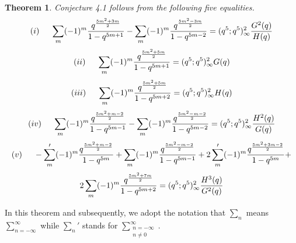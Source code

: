\documentclass[10pt,reqno]{amsart}
\newtheorem{theorem}{Theorem}[section]
\begin{document}
\begin{theorem}
Conjecture 4.1 follows from the following five equalities. \begin{equation}
    (i)\hspace{0.5cm} \displaystyle\sum_{m}(-1)^m\displaystyle\frac{q^{\frac{5m^2+3m}{2}}}{1-q^{5m+1}}-\displaystyle\sum_{m}(-1)^m\displaystyle\frac{q^{\frac{5m^2-3m}{2}}}{1-q^{5m-2}}=(q^5;q^5)_{\infty}^2\displaystyle\frac{G^2(q)}{H(q)} 
\end{equation}
\begin{equation}
    (ii) \hspace{0.5cm}\displaystyle\sum_{m}(-1)^m\displaystyle\frac{q^{\frac{5m^2+5m}{2}}}{1-q^{5m+1}}=(q^5;q^5)_{\infty}^2G(q) 
\end{equation}
\begin{equation}
    (iii)\hspace{0.5cm}\displaystyle\sum_{m}(-1)^m\displaystyle\frac{q^{\frac{5m^2+5m}{2}}}{1-q^{5m+2}}=(q^5;q^5)_{\infty}^2H(q) 
\end{equation}
\begin{equation}
    (iv)\hspace{0.5cm}\displaystyle\sum_{m}(-1)^m\displaystyle\frac{q^{\frac{5m^2+m-2}{2}}}{1-q^{5m-1}}-\displaystyle\sum_{m}(-1)^m\displaystyle\frac{q^{\frac{5m^2-m-2}{2}}}{1-q^{5m-2}}=(q^5;q^5)_{\infty}^2\displaystyle\frac{H^2(q)}{G(q)} 
\end{equation}
\begin{equation*}
    (v)\hspace{0.5cm}-\displaystyle\sum_{m}' (-1)^m\displaystyle\frac{q^{\frac{5m^2+m-2}{2}}}{1-q^{5m}}+\displaystyle\sum_{m}(-1)^m\displaystyle\frac{q^{\frac{5m^2-m-2}{2}}}{1-q^{5m-1}}+2\displaystyle\sum_{m}'(-1)^m\displaystyle\frac{q^{\frac{5m^2+3m-2}{2}}}{1-q^{5m}}+
\end{equation*}
\begin{equation}
2\displaystyle\sum_{m}(-1)^m\displaystyle\frac{q^{\frac{5m^2+7m}{2}}}{1-q^{5m+2}}=\\ \\
    (q^5;q^5)_{\infty}^2\displaystyle\frac{H^3(q)}{G^2(q)}
\end{equation}
\end{theorem}
In this theorem and subsequently, we adopt the notation that $\displaystyle\sum_{n}$ means $\displaystyle\sum_{n=-\infty}^{\infty}$ while $\displaystyle\sum_{n}'$ stands for $\displaystyle\sum_{\substack{n=-\infty\\n\neq 0}}^{\infty}.$
\end{document}
